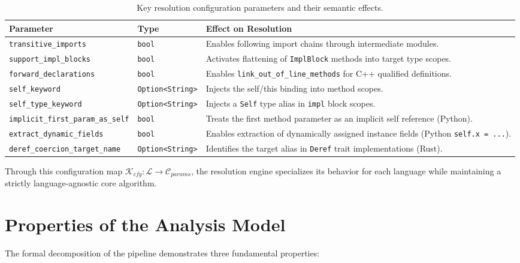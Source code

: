 \begin{table}[htpb]
  \centering
  \small
  \begin{tabular}{|l|l|p{6cm}|}
    \hline
    \textbf{Parameter} & \textbf{Type} & \textbf{Effect on Resolution} \\ \hline
    \texttt{transitive\_imports} & \texttt{bool} & Enables following import chains through intermediate modules. \\ \hline
    \texttt{support\_impl\_blocks} & \texttt{bool} & Activates flattening of \texttt{ImplBlock} methods into target type scopes. \\ \hline
    \texttt{forward\_declarations} & \texttt{bool} & Enables \texttt{link\_out\_of\_line\_methods} for C++ qualified definitions. \\ \hline
    \texttt{self\_keyword} & \texttt{Option<String>} & Injects the self/this binding into method scopes. \\ \hline
    \texttt{self\_type\_keyword} & \texttt{Option<String>} & Injects a \texttt{Self} type alias in \texttt{impl} block scopes. \\ \hline
    \texttt{implicit\_first\_param\_as\_self} & \texttt{bool} & Treats the first method parameter as an implicit self reference (Python). \\ \hline
    \texttt{extract\_dynamic\_fields} & \texttt{bool} & Enables extraction of dynamically assigned instance fields (Python \texttt{self.x = ...}). \\ \hline
    \texttt{deref\_coercion\_target\_name} & \texttt{Option<String>} & Identifies the target alias in \texttt{Deref} trait implementations (Rust). \\ \hline
  \end{tabular}
  \caption{Key resolution configuration parameters and their semantic effects.}
  \label{tab:resolution_config}
\end{table}

Through this configuration map $\mathcal{K}_{cfg}: \mathcal{L} \to \mathcal{C}_{params}$, the resolution engine specializes its behavior for each language while maintaining a strictly language-agnostic core algorithm.

\section{Properties of the Analysis Model}
\label{sec:analysis_properties}

The formal decomposition of the pipeline demonstrates three fundamental properties:

